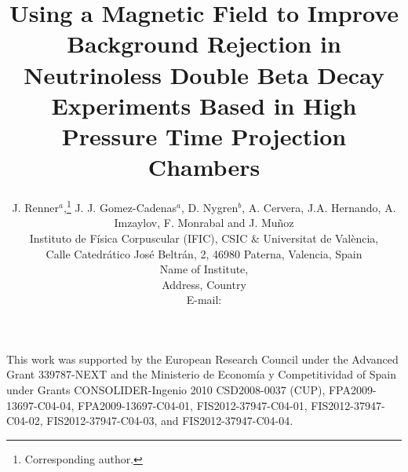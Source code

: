 \documentclass{JINST}
\title{Using a Magnetic Field to Improve Background Rejection in Neutrinoless Double Beta Decay Experiments Based in High Pressure Time Projection Chambers}
\author{J. Renner$^a$,\thanks{Corresponding author.}
J. J. Gomez-Cadenas$^a$,
D. Nygren$^b$, A. Cervera, J.A. Hernando, A. Imzaylov, F. Monrabal and J. Mu\~noz\\
\llap{$^a$}Instituto de F\'isica Corpuscular (IFIC), CSIC \& Universitat de Val\`encia,\\ 
Calle Catedr\'atico Jos\'e Beltr\'an, 2, 46980 Paterna, Valencia, Spain\\
\llap{$^b$}Name of Institute,\\
  Address, Country\\
E-mail: \email{CorrespondingAuthor@email.com}}
\begin{document}
 


 
 
\acknowledgments

This work was supported by the European Research Council under the Advanced Grant 339787-NEXT and the Ministerio de Econom\'{i}a y Competitividad of Spain under Grants CONSOLIDER-Ingenio 2010 CSD2008-0037 (CUP), FPA2009-13697-C04-04, FPA2009-13697-C04-01, FIS2012-37947-C04-01, FIS2012-37947-C04-02, FIS2012-37947-C04-03, and FIS2012-37947-C04-04.



\end{document}
